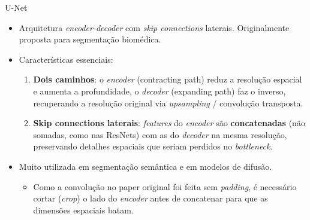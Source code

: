 \documentclass[aspectratio=169,xcolor=dvipsnames]{beamer}
\begin{document}
\begin{frame}{U-Net}
\begin{itemize}
    \item Arquitetura \textit{encoder-decoder} com \textit{skip connections} laterais. Originalmente proposta para segmentação biomédica.
    \item Características essenciais:
    \begin{enumerate}
        \item \textbf{Dois caminhos}: o \textit{encoder} (contracting path) reduz a resolução espacial e aumenta a profundidade, o \textit{decoder} (expanding path) faz o inverso, recuperando a resolução original via \textit{upsampling} / convolução transposta.
        \item \textbf{Skip connections laterais}: \textit{features} do \textit{encoder} são \textbf{concatenadas} (não somadas, como nas ResNets) com as do \textit{decoder} na mesma resolução, preservando detalhes espaciais que seriam perdidos no \textit{bottleneck}.
    \end{enumerate}
    \item Muito utilizada em segmentação semântica e em modelos de difusão.
    \begin{itemize}
        \item Como a convolução no paper original foi feita sem \textit{padding}, é necessário cortar (\textit{crop}) o lado do \textit{encoder} antes de concatenar para que as dimensões espaciais batam.
    \end{itemize}
\end{itemize}
\end{frame}
\end{document}
